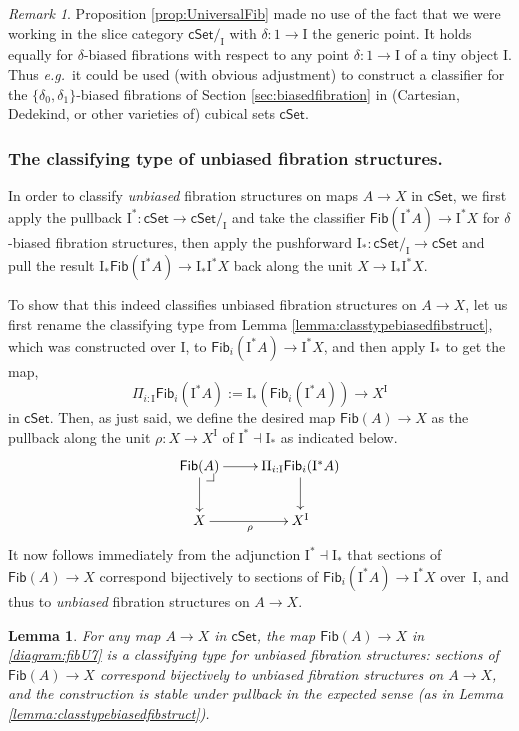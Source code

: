 \documentclass[11pt,reqno]{amsart}
\makeatletter
\newcommand{\eg}{\emph{e.g.}}
\newcommand{\cSet}{\ensuremath{\mathsf{cSet}}}
\newcommand{\slice}[1]{\ensuremath{/_{\!{#1}}}}
\newcommand{\ra}{\ensuremath{\rightarrow}}
\renewcommand{\to}{\ensuremath{\rightarrow}}
\newcommand{\too}{\ensuremath{\longrightarrow}}
\newcommand{\I}{\ensuremath{\mathrm{I}}}
\newcommand{\Fib}{\ensuremath{\mathsf{Fib}}}
\newtheorem{lemma}[theorem]{Lemma}
\theoremstyle{remark}
\newtheorem{remark}[theorem]{Remark}
\theoremstyle{definition}
\newcommand{\pbcorner}[1][dr]{\save*!/#1-1.2pc/#1:(-1,1)@^{|-}\restore}
\makeatother
\begin{document}
\begin{remark}
Proposition \ref{prop:UniversalFib} made no use of the fact that we were working in the slice category $\cSet\slice{\I}$ with $\delta : 1\to\I$ the generic point. It holds equally for $\delta$-biased fibrations with respect to any point $\delta: 1\to\I$ of a tiny object $\I$.  Thus \eg\ it could be used (with obvious adjustment) to construct a classifier for the $\{\delta_0, \delta_1\}$-biased fibrations of Section \ref{sec:biasedfibration} in (Cartesian, Dedekind, or other varieties of) cubical sets $\cSet$.  
\end{remark}


\subsubsection*{The classifying type of unbiased fibration structures.}\label{par:classifyunbiasedfib} 

In order to classify \emph{unbiased} fibration structures on maps $A\to X$ in $\cSet$, we first apply the pullback $\I^*: \cSet \ra \cSet\slice{\I}$ and take the classifier $\Fib(\I^*A)\ra \I^*X$ for $\delta$-biased fibration structures, then apply the pushforward $\I_*: \cSet\slice{\I} \ra \cSet$ and pull the result   $\I_*\Fib(\I^*A)\ra \I_*\I^*X$ back along the unit  $X \to \I_*\I^*X$.  

To show that this indeed classifies unbiased fibration structures on $A\to X$, let us first rename the classifying type from Lemma \ref{lemma:classtypebiasedfibstruct}, which was constructed over $\I$, to $\Fib_i(\I^*A) \ra \I^{*}X$, and then apply $\I_*$ to get the map,
\[
\Pi_{i:\I}\Fib_i(\I^*A) := \I_*(\Fib_i(\I^*A)) \too X^\I
\]
in $\cSet$.  Then, as just said, we define the desired map $\Fib(A)\ra X$ as the pullback along the unit $\rho : X \ra X^\I$ of  $\I^*\dashv \I_*$ as indicated below.
\begin{equation}\label{diagram:fibU7}
\xymatrix{
 \Fib(A) \ar[d] \ar[r] \pbcorner & \ar[d] \Pi_{i:\I}\Fib_i(\I^*A) \\
 X \ar[r]_{\rho} &  X^\I
}
\end{equation}
It now follows immediately from the adjunction $\I^*\dashv \I_*$ that sections of $\Fib(A)\ra X$ correspond bijectively to sections of $\Fib_i (\I^*A)\ra \I^{*}X$ over~$\I$, and thus to \emph{unbiased} fibration structures on $A\to X$.

\begin{lemma}\label{lemma:classtypeunbiasedfibstruct}
For any map $A\ra X$ in $\cSet$, the map $\Fib(A)\ra X$ in \eqref{diagram:fibU7} is a \emph{classifying type for unbiased fibration structures}: sections of $\Fib(A)\ra X$ correspond bijectively to unbiased fibration structures on $A\ra X$, and the construction is stable under pullback in the expected sense (as in Lemma \ref{lemma:classtypebiasedfibstruct}).
\end{lemma}
\end{document}
